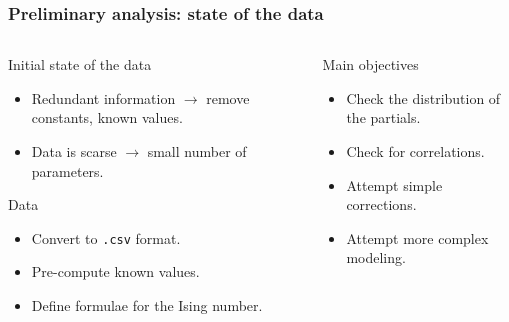 \documentclass{beamer}
\begin{document}
    \begin{frame}
        \frametitle{Preliminary analysis: state of the data}
        \begin{columns}
            \begin{column}{0.5\textwidth}
                \begin{alertblock}{Initial state of the data}
                    \begin{itemize}
                        \item Redundant information \(\to\) remove constants,
                            known values.
                        \item Data is scarse \(\to\) small number of parameters.
                    \end{itemize}
                \end{alertblock}
                \begin{block}{Data}
                    \begin{itemize}
                        \item Convert to \texttt{.csv} format.
                        \item Pre-compute known values.
                        \item Define formulae for the Ising number.
                    \end{itemize}
                \end{block}
            \end{column}
            \begin{column}{0.5\textwidth}
                \begin{block}{Main objectives}
                    \begin{itemize}
                        \item Check the distribution of the partials.
                        \item Check for correlations.
                        \item Attempt simple corrections.
                        \item Attempt more complex modeling.
                    \end{itemize}
                \end{block}
            \end{column}
        \end{columns}
    \end{frame}
\end{document}
